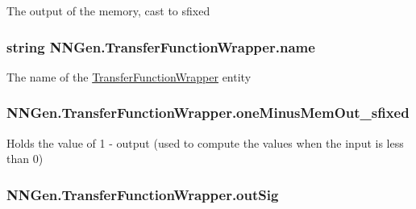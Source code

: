 The output of the memory, cast to sfixed 

\hypertarget{class_n_n_gen_1_1_transfer_function_wrapper_a06c250469e511bdca837875720dbf5e9}{}
\subsubsection[{name}]{\setlength{\rightskip}{0pt plus 5cm}string N\+N\+Gen.\+Transfer\+Function\+Wrapper.\+name\hspace{0.3cm}{\ttfamily [get]}}\label{class_n_n_gen_1_1_transfer_function_wrapper_a06c250469e511bdca837875720dbf5e9}


The name of the \hyperlink{class_n_n_gen_1_1_transfer_function_wrapper}{Transfer\+Function\+Wrapper} entity 

\hypertarget{class_n_n_gen_1_1_transfer_function_wrapper_a28102412789e840a8d62d4f1d80b6fce}{}
\subsubsection[{one\+Minus\+Mem\+Out\+\_\+sfixed}]{ N\+N\+Gen.\+Transfer\+Function\+Wrapper.\+one\+Minus\+Mem\+Out\+\_\+sfixed\hspace{0.3cm}{\ttfamily [get]}}\label{class_n_n_gen_1_1_transfer_function_wrapper_a28102412789e840a8d62d4f1d80b6fce}


Holds the value of 1 -\/ output (used to compute the values when the input is less than 0) 

\hypertarget{class_n_n_gen_1_1_transfer_function_wrapper_a5775b19c91e1a869c0c5e7587aaa4a00}{}
\subsubsection[{out\+Sig}]{ N\+N\+Gen.\+Transfer\+Function\+Wrapper.\+out\+Sig\hspace{0.3cm}{\ttfamily [get]}}\label{class_n_n_gen_1_1_transfer_function_wrapper_a5775b19c91e1a869c0c5e7587aaa4a00}


